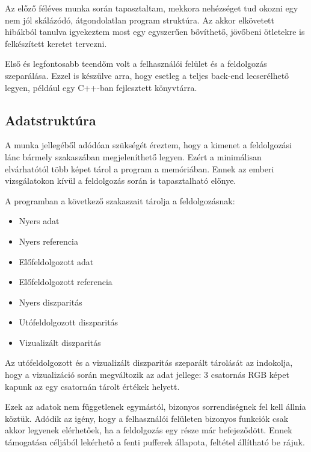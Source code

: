 Az előző féléves munka során tapasztaltam, mekkora nehézséget tud okozni egy nem jól skálázódó, átgondolatlan program struktúra.
Az akkor elkövetett hibákból tanulva igyekeztem most egy egyszerűen bővíthető, jövőbeni ötletekre is felkészített keretet tervezni.

Első és legfontosabb teendőm volt a felhasználói felület és a feldolgozás szeparálása.
Ezzel is készülve arra, hogy esetleg a teljes back-end lecserélhető legyen, például egy C++-ban fejlesztett könyvtárra.

\subsection{Adatstruktúra}\label{sect:dataStructure}

A munka jellegéből adódóan szükségét éreztem, hogy a kimenet a feldolgozási lánc bármely szakaszában megjeleníthető legyen.
Ezért a minimálisan elvárhatótól több képet tárol a program a memóriában.
Ennek az emberi vizsgálatokon kívül a feldolgozás során is tapasztalható előnye.

A programban a következő szakaszait tárolja a feldolgozásnak:
\begin{itemize}[noitemsep]
	\item Nyers adat
	\item Nyers referencia
	\item Előfeldolgozott adat
	\item Előfeldolgozott referencia
	\item Nyers diszparitás
	\item Utófeldolgozott diszparitás
	\item Vizualizált diszparitás
\end{itemize}

Az utófeldolgozott és a vizualizált diszparitás szeparált tárolását az indokolja, hogy a vizualizáció során megváltozik az adat jellege: 3 csatornás RGB képet kapunk az egy csatornán tárolt értékek helyett.

Ezek az adatok nem függetlenek egymástól, bizonyos sorrendiségnek fel kell állnia köztük.
Adódik az igény, hogy a felhasználói felületen bizonyos funkciók csak akkor legyenek elérhetőek, ha a feldolgozás egy része már befejeződött.
Ennek támogatása céljából lekérhető a fenti pufferek állapota, feltétel állítható be rájuk.

